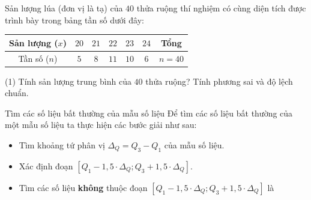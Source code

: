 \begin{vd}%
	Sản lượng lúa (đơn vị là tạ) của $40$ thửa ruộng thí nghiệm có cùng diện tích được trình bày trong bảng tần số dưới đây:
	\begin{center}
		\begin{tabular}{|c|c|c|c|c|c|c|}
			\hline 
			Sản lượng ($x$) & $20$ & $21$ & $22$ & $23$ & $24$ & Tổng \\ 
			\hline 
			Tần số ($n$) & $5$ & $8$ & $11$ & $10$ & $6$ & $n=40$ \\ 
			\hline 
		\end{tabular} 
	\end{center}
	\begin{tasks}(1)
		\task Tính sản lượng trung bình của $40$ thửa ruộng?
		\task Tính phương sai và độ lệch chuẩn.
	\end{tasks}
\end{vd}

\begin{dang}{Tìm các số liệu bất thường của mẫu số liệu}
	Để tìm các số liệu bất thường của một mẫu số liệu ta thực hiện các bước giải như sau:
	\begin{itemize}
		\item Tìm khoảng tứ phân vị $\Delta_{Q}=Q_3 - Q_1$ của mẫu số liệu.
		\item Xác định đoạn $\left[Q_1-1{,}5 \cdot 
		\Delta_{Q}; Q_3+1{,}5 \cdot 
		\Delta_{Q} \right]$.
		\item Tìm các số liệu \textbf{không} thuộc đoạn $\left[Q_1-1{,}5 \cdot	\Delta_{Q}; Q_3+1{,}5 \cdot \Delta_{Q} \right]$ là 
	\end{itemize}
\end{dang}

